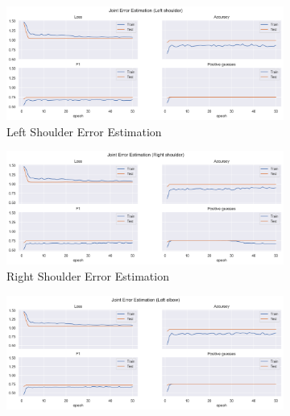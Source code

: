   
  \begin{figure}[!htbp]
    \centering
    \begin{subfigure}[b]{0.47\linewidth}
        \centering
        \includegraphics[width=\textwidth]{figures/Results/v2/jt/Left shoulder_ErrorEstimation.png}
        \caption{Left Shoulder Error Estimation}
        \label{fig:v2_lesh_jt_ee}
    \end{subfigure}
    \hfill
    \begin{subfigure}[b]{0.47\linewidth}
        \centering
        \includegraphics[width=\textwidth]{figures/Results/v2/jt/Right shoulder_ErrorEstimation.png}
        \caption{Right Shoulder Error Estimation}
        \label{fig:v2_rish_jt_ee}
    \end{subfigure}
    \hfill
    \begin{subfigure}[b]{0.47\linewidth}
        \centering
        \includegraphics[width=\textwidth]{figures/Results/v2/jt/Left ebpow_ErrorEstimation.png}

\end{subfigure}
\end{figure}
